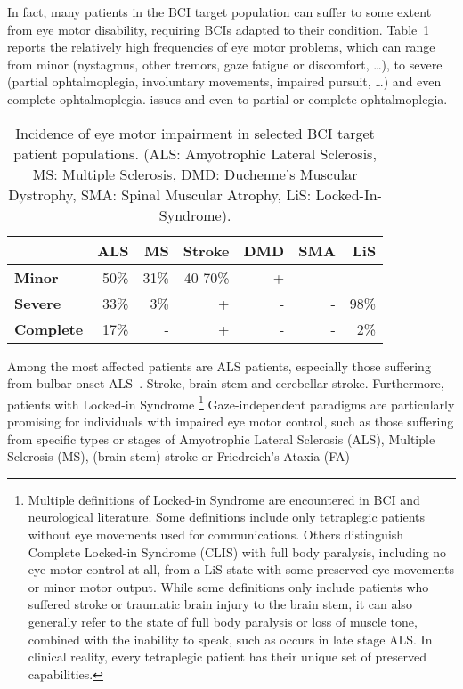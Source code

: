 In fact, many patients in the BCI target population can suffer to some extent
from eye motor disability, requiring BCIs adapted to their condition.
Table~\ref{tab:incidence} reports the relatively high frequencies of
eye motor problems, which can range from minor (nystagmus, other tremors, gaze
fatigue or discomfort, \ldots), to severe (partial ophtalmoplegia, involuntary
movements, impaired pursuit, \ldots) and even complete ophtalmoplegia.
issues and even to partial or complete ophtalmoplegia.
\begin{table}[h]
  \sffamily
  \footnotesize
	\centering
	\begin{tabular}{@{}l|rrrrr|r@{}}
              & \bfseries ALS  & \bfseries MS   & \bfseries Stroke  &\bfseries DMD &\bfseries SMA  &\bfseries LiS  \\ \hline
		\bfseries Minor    & 50\% & 31\% & 40-70\% & + & - &      \\
		\bfseries Severe   & 33\% & 3\%  & +       & - & - & 98\% \\
		\bfseries Complete & 17\% & -    & +       & - & - & 2\%  \\
	\end{tabular}
	\caption{Incidence of eye motor impairment in selected BCI target
		patient populations. (ALS: Amyotrophic Lateral Sclerosis, MS: Multiple Sclerosis,
		DMD: Duchenne's Muscular Dystrophy, SMA: Spinal Muscular Atrophy, LiS:
		Locked-In-Syndrome).}\label{tab:incidence}
\end{table}
Among the most affected patients are ALS patients, especially those suffering
from bulbar onset ALS~\cite{Guo2022}.
Stroke, brain-stem and cerebellar stroke.
Furthermore, patients with Locked-in Syndrome
\footnote{Multiple definitions of Locked-in Syndrome are encountered in
BCI and neurological literature. Some definitions include only
tetraplegic patients without eye movements used for communications. Others distinguish Complete
Locked-in Syndrome (CLIS) with full body paralysis, including no eye motor
control at all, from a LiS state with some preserved eye movements or minor
motor output.
While some definitions only include patients who suffered stroke or traumatic
brain injury to the brain stem, it can also generally refer to the state of full body paralysis
or loss of muscle tone, combined with the inability to speak, such as occurs in
late stage ALS.
In clinical reality, every tetraplegic patient has their
unique set of preserved capabilities.}
Gaze-independent paradigms are particularly
promising for individuals with impaired eye motor control, such as those
suffering from specific types or stages of Amyotrophic Lateral Sclerosis (ALS),
Multiple Sclerosis (MS), (brain stem) stroke or Friedreich's Ataxia (FA)

